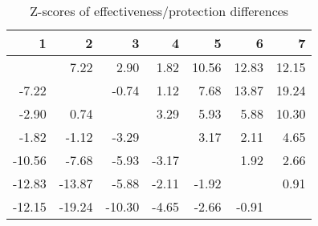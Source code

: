 \begin{table}[ht]
\centering
\begin{tabular}{rrrrrrr}
  \hline
1 & 2 & 3 & 4 & 5 & 6 & 7 \\ 
  \hline
 & 7.22 & 2.90 & 1.82 & 10.56 & 12.83 & 12.15 \\ 
  -7.22 &  & -0.74 & 1.12 & 7.68 & 13.87 & 19.24 \\ 
  -2.90 & 0.74 &  & 3.29 & 5.93 & 5.88 & 10.30 \\ 
  -1.82 & -1.12 & -3.29 &  & 3.17 & 2.11 & 4.65 \\ 
  -10.56 & -7.68 & -5.93 & -3.17 &  & 1.92 & 2.66 \\ 
  -12.83 & -13.87 & -5.88 & -2.11 & -1.92 &  & 0.91 \\ 
  -12.15 & -19.24 & -10.30 & -4.65 & -2.66 & -0.91 &  \\ 
   \hline
\end{tabular}
\caption{Z-scores of effectiveness/protection differences} 
\end{table}
